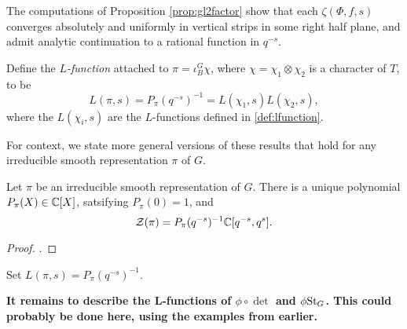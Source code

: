 \begin{rem}
    The computations of Proposition \ref{prop:gl2factor} show that each $\zeta(\Phi,f,s)$ converges absolutely and uniformly in vertical strips in some right half plane, and admit analytic continuation to a rational function in $q^{-s}$.
\end{rem}


\begin{defn}
    Define the \textit{$L$-function} attached to $\pi = \iota_B^G \chi$, where $\chi=\chi_1\otimes \chi_2$ is a character of $T$, to be $$L(\pi,s) = P_\pi(q^{-s})^{-1} = L(\chi_1,s)L(\chi_2,s),$$
    where the $L(\chi_i,s)$ are the $L$-functions defined
    in \ref{def:lfunction}.
\end{defn}

For context, we state more general versions of these results that hold for any irreducible smooth representation $\pi$ of $G$.

\begin{thm}\label{BHThm1}
    Let $\pi$ be an irreducible smooth representation of $G$. There is a unique polynomial $P_\pi(X) \in \mathbb{C}[X]$, satsifying $P_\pi(0)=1$, and 
    $$\mathcal Z(\pi) = P_\pi(q^{-s})^{-1} \mathbb{C}[q^{-s},q^s].$$
\end{thm}
\begin{proof}
    \cite[Theorem 24.2.1]{BH1}.
\end{proof}

\begin{notn}
    Set $L(\pi,s) = P_\pi(q^{-s})^{-1}$.
\end{notn}


\textbf{It remains to describe the L-functions of $\phi\circ\det$ and $\phi\mathrm{St}_G$. This could probably be done here, using the examples from earlier.}



